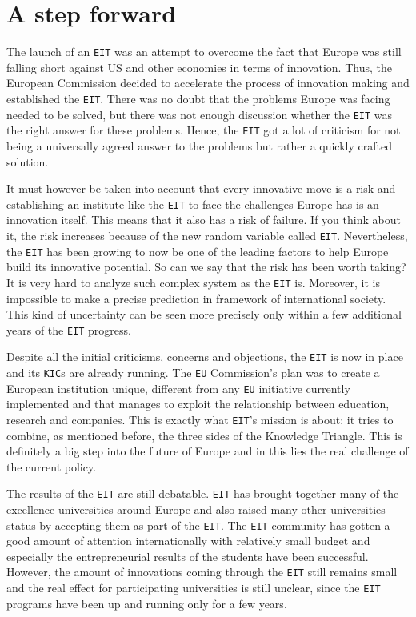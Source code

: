 \documentclass[11pt,a4paper,oneside,twocolumn]{IEEEtran}
\begin{document}
\section{A step forward}
The launch of an \texttt{EIT} was an attempt to overcome the fact that Europe was still falling short against US and other economies in terms of innovation. Thus, the European Commission decided to accelerate the process of innovation making and established the \texttt{EIT}. There was no doubt that the problems Europe was facing needed to be solved, but there was not enough discussion whether the \texttt{EIT} was the right answer for these problems. Hence, the \texttt{EIT} got a lot of criticism for not being a universally agreed answer to the problems but rather a quickly crafted solution.

It must however be taken into account that every innovative move is a risk and establishing an institute like the \texttt{EIT} to face the challenges Europe has is an innovation itself. This means that it also has a risk of failure. If you think about it, the risk increases because of the new random variable called \texttt{EIT}. Nevertheless, the \texttt{EIT} has been growing to now be one of the leading factors to help Europe build its innovative potential. So can we say that the risk has been worth taking? It is very hard to analyze such complex system as the \texttt{EIT} is. Moreover, it is impossible to make a precise prediction in framework of international society. This kind of  uncertainty can be seen more precisely only within a few additional years of the \texttt{EIT} progress.

Despite all the initial criticisms, concerns and objections, the \texttt{EIT} is now in place and its \texttt{KIC}s are already running. The \texttt{EU} Commission's plan was to create a European institution unique, different from any \texttt{EU} initiative currently implemented and that manages to exploit the relationship between education, research and companies. This is exactly what \texttt{EIT}'s mission is about: it tries to combine, as mentioned before, the three sides of the Knowledge Triangle. This is definitely a big step into the future of Europe and in this lies the real challenge of the current policy.

The results of the \texttt{EIT} are still debatable. \texttt{EIT} has brought together many of the excellence universities around Europe and also raised many other universities status by accepting them as part of the \texttt{EIT}. The \texttt{EIT} community has gotten a good amount of attention internationally with relatively small budget and especially the entrepreneurial results of the students have been successful. However, the amount of innovations coming through the \texttt{EIT} still remains small and the real effect for participating universities is still unclear, since the \texttt{EIT} programs have been up and running only for a few years.
\end{document}
